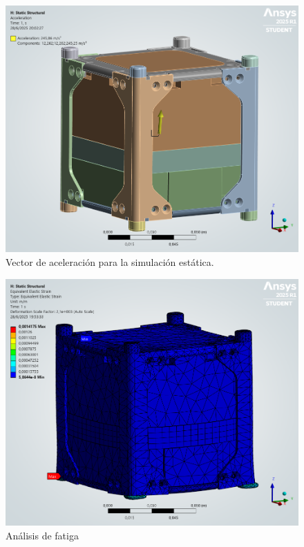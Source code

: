  \begin{figure}[H]
    \centering
    \includegraphics[width=14cm]{image/fem/ansys_cubesat-static_acceleration.png}
    \caption{Vector de aceleración para la simulación estática.}
  \end{figure}

  \begin{figure}[H]
    \centering
    \includegraphics[width=14cm]{image/fem/ansys_cubesat-static_strain.png}
    \caption{Análisis de fatiga}
  \end{figure}


